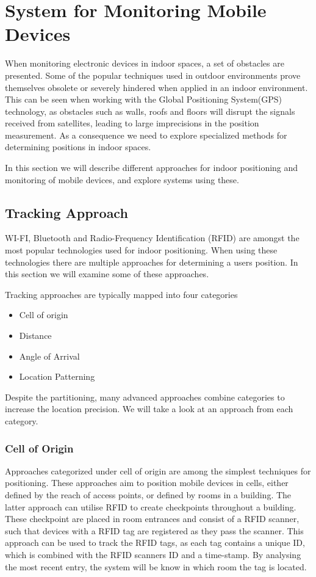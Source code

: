 \section{System for Monitoring Mobile Devices}\label{sec:monitoring}
When monitoring electronic devices in indoor spaces, a set of obstacles are presented. Some of the popular techniques used in outdoor environments prove themselves obsolete or severely hindered when applied in an indoor environment.  This can be seen when working with the Global Positioning System(GPS) technology, as obstacles such as walls, roofs and floors will disrupt the signals received from satellites, leading to large imprecisions in the position measurement. As a consequence we need to explore specialized methods for determining positions in indoor spaces.

In this section we will describe different approaches for indoor positioning and monitoring of mobile devices, and explore systems using these.

\subsection{Tracking Approach}\label{sec:tracking_approach}
WI-FI, Bluetooth and Radio-Frequency Identification (RFID) are amongst the most popular technologies used for indoor positioning. When using these technologies there are multiple approaches for determining a users position. In this section we will examine some of these approaches.

Tracking approaches are typically mapped into four categories\cite{tracking_approaches}
\begin{itemize}
\item Cell of origin
\item Distance
\item Angle of Arrival
\item Location Patterning
\end{itemize}
Despite the partitioning, many advanced approaches combine categories to increase the location precision. We will take a look at an approach from each category.

\subsubsection*{Cell of Origin}
Approaches categorized under cell of origin are among the simplest techniques for positioning. These approaches aim to position mobile devices in cells, either defined by the reach of access points, or defined by rooms in a building.
The latter approach can utilise RFID to create checkpoints throughout a building. These checkpoint are placed in room entrances and consist of a RFID scanner, such that devices with a RFID tag are registered as they pass the scanner\cite{indoor_bin}. 
This approach can be used to track the RFID tags, as each tag contains a unique ID, which is combined with the RFID scanners ID and a time-stamp. By analysing the most recent entry, the system will be know in which room the tag is located\cite{RFIDjournal}.

